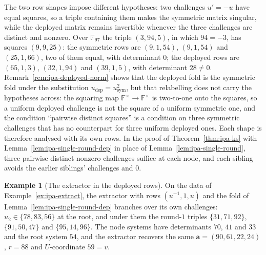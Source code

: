 \documentclass[11pt,a4paper]{article}
\theoremstyle{definition}
\newtheorem{example}[theorem]{Example}
\newcommand{\F}{\mathbb{F}}
\begin{document}
The two row shapes impose different hypotheses: two challenges
$u' = -u$ have equal squares, so a triple containing them makes the
symmetric matrix singular, while the deployed matrix remains invertible
whenever the three challenges are distinct and nonzero.
Over $\F_{97}$ the triple $(3, 94, 5)$, in which $94 = -3$, has squares
$(9, 9, 25)$: the symmetric rows are $(9, 1, 54)$, $(9, 1, 54)$ and
$(25, 1, 66)$, two of them equal, with determinant $0$; the deployed
rows are $(65, 1, 3)$, $(32, 1, 94)$ and $(39, 1, 5)$, with determinant
$28 \ne 0$. Remark~\ref{rem:ipa-deployed-norm} shows that the deployed
fold is the symmetric fold under the substitution $u_{\mathrm{dep}} =
u_{\mathrm{sym}}^{2}$, but that relabelling does not carry the
hypotheses across: the squaring map $\F^{\times} \to \F^{\times}$ is
two-to-one onto the squares, so a uniform deployed challenge is not the
square of a uniform symmetric one, and the condition ``pairwise
distinct squares'' is a condition on three symmetric challenges that
has no counterpart for three uniform deployed ones. Each shape is
therefore analysed with its own rows. In the proof of
Theorem~\ref{thm:ipa-ks} with Lemma~\ref{lem:ipa-single-round-dep} in
place of Lemma~\ref{lem:ipa-single-round}, three pairwise distinct
nonzero challenges suffice at each node, and each sibling avoids the
earlier siblings' challenges and $0$.

\begin{example}[The extractor in the deployed rows]
\label{ex:ipa-extract-dep}
On the data of Example~\ref{ex:ipa-extract}, the extractor with rows
$(u^{-1}, 1, u)$ and the fold of Lemma~\ref{lem:ipa-single-round-dep}
branches over its own challenges: $u_2 \in \{78, 83, 56\}$ at the root,
and under them the round-$1$ triples $\{31, 71, 92\}$, $\{91, 50, 47\}$
and $\{95, 14, 96\}$. The node systems have determinants $70$, $41$ and
$33$ and the root system $54$, and the extractor recovers the same
$\mathbf a = (90, 61, 22, 24)$, $r = 88$ and $U$-coordinate $59 = v$.
\end{example}
\end{document}
